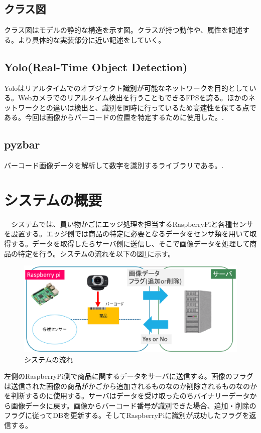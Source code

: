 \subsection*{クラス図}
クラス図はモデルの静的な構造を示す図。クラスが持つ動作や、属性を記述する。より具体的な実装部分に近い記述をしていく。

\subsection*{Yolo(Real-Time Object Detection)}
Yoloはリアルタイムでのオブジェクト識別が可能なネットワークを目的としている。Webカメラでのリアルタイム検出を行うこともできるFPSを誇る。ほかのネットワークとの違いは検出と、識別を同時に行っているため高速性を保てる点である。今回は画像からバーコードの位置を特定するために使用した。\cite{yolo}.


\subsection*{pyzbar}
バーコード画像データを解析して数字を識別するライブラリである。\cite{pyzbar}.

\section{システムの概要}
　システムでは、買い物かごにエッジ処理を担当するRaspberryPiと各種センサを設置する。エッジ側では商品の特定に必要となるデータをセンサ類を用いて取得する。データを取得したらサーバ側に送信し、そこで画像データを処理して商品の特定を行う。システムの流れを以下の図\ref{system_summary}に示す。


\begin{figure}[htbp]
\centering
\includegraphics[width=12cm]{./pic/summary.eps}
\caption{システムの流れ}
\label{system_summary}
\end{figure}

左側のRaspberryPi側で商品に関するデータをサーバに送信する。画像のフラグは送信された画像の商品がかごから追加されるものなのか削除されるものなのかを判断するのに使用する。サーバはデータを受け取ったのちバイナリーデータから画像データに戻す。画像からバーコード番号が識別できた場合、追加・削除のフラグに従ってDBを更新する。そしてRaspberryPiに識別が成功したフラグを返信する。
